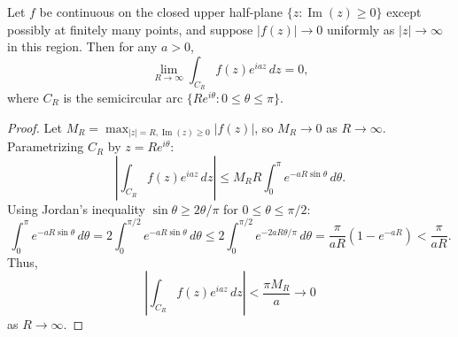 \begin{lemma}
  Let $f$ be continuous on the closed upper half-plane $\{z : \operatorname{Im}(z) \geq 0\}$ except possibly at finitely many points, and suppose $|f(z)| \to 0$ uniformly as $|z| \to \infty$ in this region. Then for any $a > 0$,
  \[
    \lim_{R \to \infty} \int_{C_R} f(z) e^{iaz} \, dz = 0,
  \]
  where $C_R$ is the semicircular arc $\{Re^{i\theta} : 0 \leq \theta \leq \pi\}$.
\end{lemma}

\begin{proof}
  Let $M_R = \max_{|z| = R, \operatorname{Im}(z) \geq 0} |f(z)|$, so $M_R \to 0$ as $R \to \infty$.
  Parametrizing $C_R$ by $z = Re^{i\theta}$:
  \[
    \left| \int_{C_R} f(z) e^{iaz} \, dz \right| \leq M_R R \int_0^{\pi} e^{-aR\sin\theta} \, d\theta.
  \]
  Using Jordan's inequality $\sin\theta \geq 2\theta/\pi$ for $0 \leq \theta \leq \pi/2$:
  \[
    \int_0^{\pi} e^{-aR\sin\theta} \, d\theta = 2\int_0^{\pi/2} e^{-aR\sin\theta} \, d\theta \leq 2\int_0^{\pi/2} e^{-2aR\theta/\pi} \, d\theta = \frac{\pi}{aR}(1 - e^{-aR}) < \frac{\pi}{aR}.
  \]
  Thus,
  \[
    \left| \int_{C_R} f(z) e^{iaz} \, dz \right| < \frac{\pi M_R}{a} \to 0
  \]
  as $R \to \infty$.
\end{proof}

